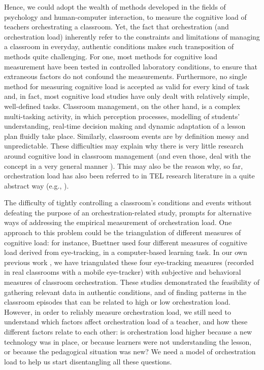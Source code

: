 \documentclass[10pt,journal,compsoc]{IEEEtran}
\begin{document}
Hence, we could adopt the wealth of methods developed in the fields of psychology and human-computer interaction, to measure the cognitive load of teachers orchestrating a classroom. Yet, the fact that orchestration (and orchestration load) inherently refer to the constraints and limitations of managing a classroom in everyday, authentic conditions \cite{Roschelle2013} makes such transposition of methods quite challenging. For one, most methods for cognitive load measurement have been tested in controlled laboratory conditions, to ensure that extraneous factors do not confound the measurements. Furthermore, no single method for measuring cognitive load is accepted as valid for every kind of task \cite{boucsein2000engineering} and, in fact, most cognitive load studies have only dealt with relatively simple, well-defined tasks. Classroom management, on the other hand, is a complex multi-tasking activity, in which perception processes, modelling of students' understanding, real-time decision making and dynamic adaptation of a lesson plan fluidly take place. Similarly, classroom events are by definition messy and unpredictable. These difficulties may explain why there is very little research around cognitive load in classroom management (and even those, deal with the concept in a very general manner \cite{feldon2007cognitive}). This may also be the reason why, so far, orchestration load has also been referred to in TEL research literature in a quite abstract way (e.g., \cite{Cuendet2013, munoz2013sharing}).

The difficulty of tightly controlling a classroom's conditions and events without defeating the purpose of an orchestration-related study, prompts for alternative ways of addressing the empirical measurement of orchestration load. One approach to this problem could be the triangulation of different measures of cognitive load: for instance, Buettner \cite{Buettner2013} used four different measures of cognitive load derived from eye-tracking, in a computer-based learning task. In our own previous work \cite{Prieto2015ectel}, we have triangulated these four eye-tracking measures (recorded in real classrooms with a mobile eye-tracker) with subjective and behavioral measures of classroom orchestration. These studies demonstrated the feasibility of gathering relevant data in authentic conditions, and of finding patterns in the classroom episodes that can be related to high or low orchestration load. However, in order to reliably measure orchestration load, we still need to understand which factors affect orchestration load of a teacher, and how these different factors relate to each other: is orchestration load higher because a new technology was in place, or because learners were not understanding the lesson, or because the pedagogical situation was new? We need a model of orchestration load to help us start disentangling all these questions.
\end{document}
